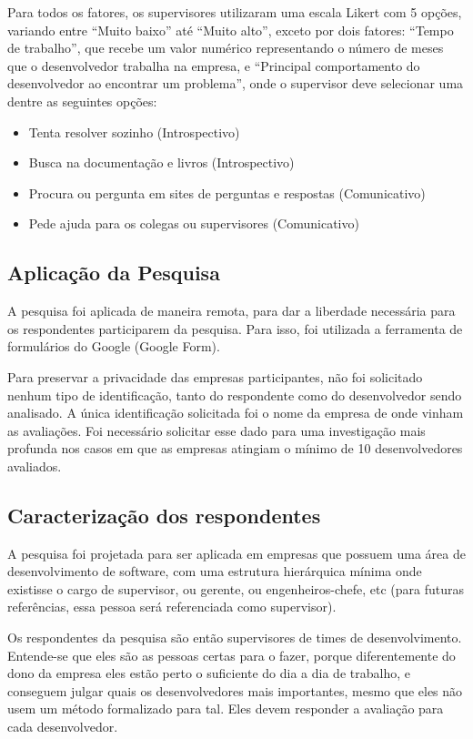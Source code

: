 Para todos os fatores, os supervisores utilizaram uma escala Likert com 5 opções, variando entre ``Muito baixo'' até ``Muito alto'', exceto por dois fatores: ``Tempo de trabalho'', que recebe um valor numérico representando o número de meses que o desenvolvedor trabalha na empresa, e ``Principal comportamento do desenvolvedor ao encontrar um problema'', onde o supervisor deve selecionar uma dentre as seguintes opções:

\begin{itemize}
	\item Tenta resolver sozinho (Introspectivo)
	\item Busca na documentação e livros (Introspectivo)
	\item Procura ou pergunta em sites de perguntas e respostas (Comunicativo)
	\item Pede ajuda para os colegas ou supervisores (Comunicativo)
\end{itemize}

\subsection{Aplicação da Pesquisa}

A pesquisa foi aplicada de maneira remota, para dar a liberdade necessária para os respondentes participarem da pesquisa. Para isso, foi utilizada a ferramenta de formulários do Google (Google Form).

Para preservar a privacidade das empresas participantes, não foi solicitado nenhum tipo de identificação, tanto do respondente como do desenvolvedor sendo analisado. A única identificação solicitada foi o nome da empresa de onde vinham as avaliações. Foi necessário solicitar esse dado para uma investigação mais profunda nos casos em que as empresas atingiam o mínimo de 10 desenvolvedores avaliados.

\subsection{Caracterização dos respondentes}\label{caracterizacao_respondentes}

A pesquisa foi projetada para ser aplicada em empresas que possuem uma área de desenvolvimento de software, com uma estrutura hierárquica mínima onde existisse o cargo de supervisor, ou gerente, ou engenheiros-chefe, etc (para futuras referências, essa pessoa será referenciada como supervisor).

Os respondentes da pesquisa são então supervisores de times de desenvolvimento. Entende-se que eles são as pessoas certas para o fazer, porque diferentemente do dono da empresa eles estão perto o suficiente do dia a dia de trabalho, e conseguem julgar quais os desenvolvedores mais importantes, mesmo que eles não usem um método formalizado para tal. Eles devem responder a avaliação para cada desenvolvedor.

